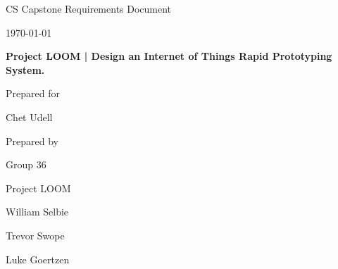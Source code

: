 \documentclass[onecolumn, draftclsnofoot,10pt, compsoc]{IEEEtran}
\def \CapstoneTeamName{		Project LOOM}
\def \CapstoneTeamNumber{		36}
\def \GroupMemberOne{			William Selbie}
\def \GroupMemberTwo{			Trevor Swope}
\def \GroupMemberThree{			Luke Goertzen}
\def \CapstoneProjectName{		Project LOOM | Design an Internet of Things Rapid Prototyping System.}
\def \CapstoneSponsorCompany{	}
\def \CapstoneSponsorPerson{		Chet Udell}
\def \DocType{	%
				Requirements Document
				}
\newcommand{\NameSigPair}[1]{\par
\makebox[2.75in][r]{#1} \hfil 	\makebox[3.25in]{\makebox[2.25in]{\hrulefill} \hfill		\makebox[.75in]{\hrulefill}}
\par\vspace{-12pt} \textit{\tiny\noindent
\makebox[2.75in]{} \hfil		\makebox[3.25in]{\makebox[2.25in][r]{Signature} \hfill	\makebox[.75in][r]{Date}}}}
\renewcommand{\NameSigPair}[1]{#1}
\begin{document}
\begin{titlepage}
    \begin{singlespace}
        \hfill 
        \par\vspace{.2in}
        \centering
        \scshape{
            \huge CS Capstone \DocType \par
            {\large\today}\par
            \vspace{.5in}
            \textbf{\Huge\CapstoneProjectName}\par
            \vfill
            {\large Prepared for}\par
            \Huge \CapstoneSponsorCompany\par
            \vspace{5pt}
            {\Large\NameSigPair{\CapstoneSponsorPerson}\par}
            {\large Prepared by }\par
            Group\CapstoneTeamNumber\par
            \CapstoneTeamName\par 
            \vspace{5pt}
            {\Large
                \NameSigPair{\GroupMemberOne}\par
                \NameSigPair{\GroupMemberTwo}\par
                \NameSigPair{\GroupMemberThree}\par
            }
            \vspace{20pt}
        }
    \end{singlespace}
\end{titlepage}
\end{document}
